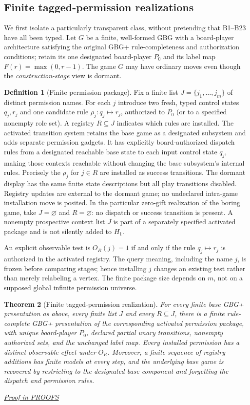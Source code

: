 \documentclass[11pt,letterpaper]{article}
\newtheorem{theorem}{Theorem}[section]
\theoremstyle{definition}\newtheorem{definition}[theorem]{Definition}\newtheorem{example}[theorem]{Example}
\theoremstyle{remark}\newtheorem{remark}[theorem]{Remark}
\newcommand{\prooflink}[1]{\par\noindent\hfill\small\hyperref[#1]{\textit{Proof in PROOFS}}\normalsize}
\begin{document}
\subsection{Finite tagged-permission realizations}
We first isolate a particularly transparent class, without pretending that B1--B23 have all been typed. Let $G$ be a finite, well-formed GBG with a board-player architecture satisfying the original GBG+ rule-completeness and authorization conditions; retain its one designated board-player $P_0$ and its label map $F(r)=\max(0,r-1)$. The game $G$ may have ordinary moves even though the \emph{construction-stage} view is dormant.

\begin{definition}[Finite permission package]\label{w1:def:permission}
Fix a finite list $J=\{j_1,\ldots,j_m\}$ of distinct permission names. For each $j$ introduce two fresh, typed control states $q_j,r_j$ and one candidate rule $\rho_j:q_j\mapsto r_j$, authorized to $P_0$ (or to a specified nonempty role set). A registry $R\subseteq J$ indicates which rules are installed. The activated transition system retains the base game as a designated
subsystem and adds separate permission gadgets. It has explicitly
board-authorized dispatch rules from a designated reachable base state to
each input control state $q_j$, making those contexts reachable without
changing the base subsystem's internal rules. Precisely the $\rho_j$ for
$j\in R$ are installed as success transitions. The dormant display has the same finite state descriptions but all play transitions disabled. Registry updates are external to the dormant game; no undeclared intra-game installation move is posited. In the particular zero-gift realization of the boring game, take $J=\varnothing$ and $R=\varnothing$: no dispatch or success transition is present. A nonempty prospective context list $J$ is part of a separately specified activated package and is not silently added to $H_1$.
\end{definition}

An explicit observable test is $O_R(j)=1$ if and only if the rule $q_j\mapsto r_j$ is authorized in the activated registry. The query meaning, including the name $j$, is frozen before comparing stages; hence installing $j$ changes an existing test rather than merely relabeling a vertex. The finite package size depends on $m$, not on a supposed global infinite permission universe.

\begin{theorem}[Finite tagged-permission realization]\label{w1:th:finite}
For every finite base GBG+ presentation as above, every finite list $J$ and every $R\subseteq J$, there is a finite rule-complete GBG+ presentation of the corresponding activated permission package, with unique board-player $P_0$, declared partial unary transitions, nonempty authorized sets, and the unchanged label map. Every installed permission has a distinct observable effect under $O_R$. Moreover, a finite sequence of registry additions has finite models at every step, and the underlying base game is recovered by restricting to the designated base component and forgetting the dispatch and permission rules.
\prooflink{w1:pr:finite}
\end{theorem}
\end{document}
